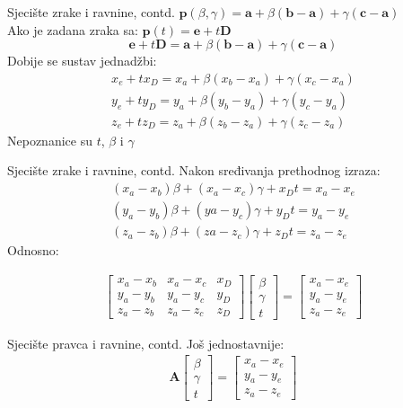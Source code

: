 \documentclass[9pt]{beamer}
\begin{document}
\begin{frame}{Sjecište zrake i ravnine, contd.}
	$\textbf{p}(\beta, \gamma) = \textbf{a} + \beta(\textbf{b}-\textbf{a}) + \gamma(\textbf{c}-\textbf{a})$ 
	\\
	Ako je zadana zraka sa: $\textbf{p}(t) = \textbf{e}+t\textbf{D}$
	$$\textbf{e}+t\textbf{D} = \textbf{a} + \beta(\textbf{b}-\textbf{a}) + \gamma(\textbf{c}-\textbf{a})$$
	Dobije se sustav jednadžbi:
	\begin{align*}
	x_e+tx_D = x_a + \beta(x_b-x_a) + \gamma(x_c-x_a)\\
	y_e+ty_D = y_a + \beta(y_b-y_a) + \gamma(y_c-y_a)\\
	z_e+tz_D = z_a + \beta(z_b-z_a) + \gamma(z_c-z_a)
	\end{align*}
	Nepoznanice su $t$, $\beta$ i $\gamma$
\end{frame}	

\begin{frame}{Sjecište zrake i ravnine, contd.}
	Nakon sređivanja prethodnog izraza:
	\begin{align*}
	(x_a-x_b)\beta + (x_a-x_c)\gamma + x_Dt=x_a-x_e\\
	(y_a-y_b)\beta + (ya-y_c)\gamma + y_Dt=y_a-y_e\\
	(z_a-z_b)\beta + (za-z_c)\gamma + z_Dt=z_a-z_e
	\end{align*}
	Odnosno:
	
	\begin{align*}
	\left[
	\begin{array}{ccc}
	x_a-x_b&  x_a-x_c&  x_D \\ 
	y_a-y_b&  y_a-y_c&  y_D  \\ 
	z_a-z_b&  z_a-z_c&  z_D
	\end{array} 
	\right]
	\left[
	\begin{array}{c}
	\beta \\ \gamma \\ t
	\end{array} 
	\right] =
	\left[
	\begin{array}{c}
	x_a-x_e \\ y_a-y_e \\ z_a-z_e
	\end{array} 
	\right]
	\end{align*}
\end{frame}	

\begin{frame}{Sjecište pravca i ravnine, contd.}
	Još jednostavnije:
	\begin{align*}
	\textbf{A}
	\left[
	\begin{array}{c}
	\beta \\ \gamma \\ t
	\end{array} 
	\right] =
	\left[
	\begin{array}{c}
	x_a-x_e \\ y_a-y_e \\ z_a-z_e
	\end{array} 
	\right]
	\end{align*}
	
\end{frame}
\end{document}
